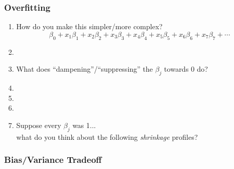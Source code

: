 \documentclass[xcolor={dvipsnames}]{beamer}
\begin{document}
\frame
{
\frametitle{Overfitting}

\begin{enumerate}
\item<1-> How do you make this simpler/more complex? 
$$\beta_0 + x_1 \beta_1 + x_2 \beta_2 + x_3 \beta_3 + x_4 \beta_4 + x_5 \beta_5 +  x_6 \beta_6 +  x_7 \beta_7 + \cdots $$ 
\item[]
\item<2-> What does ``dampening''/``suppressing'' the $\beta_j$ towards 0 do? 
\item[]
\item<3-> \color{Maroon}{Why might we like this?}
\item[]
\item<4-> Suppose every $\beta_j$ was 1... \\what do you think about the following \emph{shrinkage} profiles? 
\end{enumerate}


\begin{figure}
\centering
{}
\end{figure}
 
}






\frame
{
\frametitle{Bias/Variance Tradeoff}

}
\end{document}
